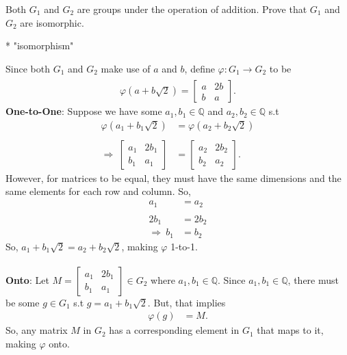 \documentclass[12pt, letterpaper]{article}
\begin{document}
\qquad Both $G_1$ and $G_2$ are groups under the operation of addition. Prove that $G_1$ and $G_2$ are isomorphic.
\begin{center}
    * "isomorphism" \Rightarrow \ 
\end{center}
Since both $G_1$ and $G_2$ make use of $a$ and $b$, define $\varphi : G_1 \xrightarrow[]{} G_2$ to be 
\begin{align*}
    \varphi(a + b\sqrt{2}) = \begin{bmatrix}
        a & 2b \\
        b & a
    \end{bmatrix}.
\end{align*}
\textbf{One-to-One}: 
Suppose we have some $a_1,b_1 \in \mathbb{Q}$ and $a_2,b_2 \in \mathbb{Q}$ s.t
\begin{align*}
    \varphi(a_1 + b_1 \sqrt{2}) &= \varphi(a_2 + b_2\sqrt{2}) \\ \\
    \Rightarrow \ \begin{bmatrix}
        a_1 & 2b_1\\
        b_1 & a_1
    \end{bmatrix} &= \begin{bmatrix}
        a_2 & 2b_2 \\
        b_2 & a_2
    \end{bmatrix}.
\end{align*}
However, for matrices to be equal, they must have the same dimensions and the same elements for each row and column. So,
\begin{align*}
    a_1 &= a_2  \\ \\
    2b_1 &= 2b_2 \\
    \Rightarrow \ b_1&= b_2 
\end{align*}
So, $a_1 + b_1 \sqrt{2} = a_2 + b_2\sqrt{2}$, making $\varphi$ 1-to-1. \\ \\
\textbf{Onto}: Let $M = \begin{bmatrix}
    a_1 & 2b_1 \\
    b_1 & a_1
\end{bmatrix} \in G_2$ where $a_1,b_1 \in \mathbb{Q}$. Since $a_1, b_1 \in \mathbb{Q}$, there must be some $g \in G_1$ s.t $g = a_1 + b_1\sqrt{2}$. But, that implies 
\begin{align*}
    \varphi(g) &= M.
\end{align*}
So, any matrix $M$ in $G_2$ has a corresponding element in $G_1$ that maps to it, making $\varphi$ onto. \\ \\
\end{document}
